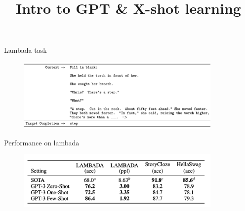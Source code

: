



\newcommand{\learninggoals}{
\item Recap GPT and the ideas behind standard language modelling
\item Understand the difference between fine-tuning and X-shot learning}
\def\myblue#1{\textcolor{texblue}{#1}}

\title{Intro to GPT \& X-shot learning}
\date{}




\begin{vbframe}{Lambada task}

\vfill

	\begin{figure}
		\centering
		\includegraphics[width=10cm]{figure/lambadaformat.png}
	\end{figure}

\vfill

\end{vbframe}


\begin{vbframe}{Performance on lambada}

\vfill

	\begin{figure}
		\centering
		\includegraphics[width=10cm]{figure/lambadaperf.png}
	\end{figure}

\vfill

\end{vbframe}

